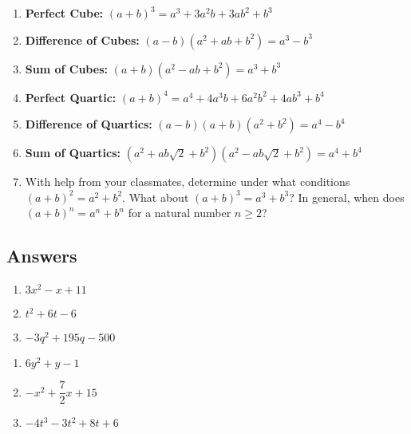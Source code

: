 \begin{enumerate}
\setcounter{enumi}{\value{HW}}

\item \textbf{Perfect Cube:} $(a+b)^3 = a^3 + 3a^2b + 3ab^2 + b^3$ \label{specialformexfirst}

\item  \textbf{Difference of Cubes:} $(a - b)(a^2 + ab + b^2) = a^3 - b^3$

\item  \textbf{Sum of Cubes:} $(a + b)(a^2 - ab + b^2) = a^3 + b^3$

\item  \textbf{Perfect Quartic:} $(a+b)^4 = a^4 + 4a^3b + 6a^2b^2 + 4ab^3 + b^4$

\item  \textbf{Difference of Quartics:} $(a-b)(a+b)(a^2+b^2) = a^4 - b^4$

\item  \textbf{Sum of Quartics:}  $(a^2 + ab \sqrt{2} + b^2)(a^2 - ab \sqrt{2} + b^2) = a^4 + b^4$ \label{specialformexlast}

\item  With help from your classmates, determine under what conditions $(a+b)^2 = a^2 + b^2$.  What about $(a+b)^3 = a^3 + b^3$? In general, when does $(a+b)^n = a^n + b^n$ for a natural number $n \geq 2$?

\setcounter{HW}{\value{enumi}}
\end{enumerate}


\newpage

\subsection{Answers}
\begin{multicols}{3}
\begin{enumerate}

\item $3x^2 - x + 11$
\item $t^2 + 6t-6$
\item $-3q^2+195q-500$

\setcounter{HW}{\value{enumi}}
\end{enumerate}
\end{multicols}

\begin{multicols}{3}
\begin{enumerate}
\setcounter{enumi}{\value{HW}}

\item $6y^2+y-1$
\item $-x^2 + \dfrac{7}{2} x + 15$
\item $-4t^3-3t^2+8t+6$

\setcounter{HW}{\value{enumi}}
\end{enumerate}
\end{multicols}

